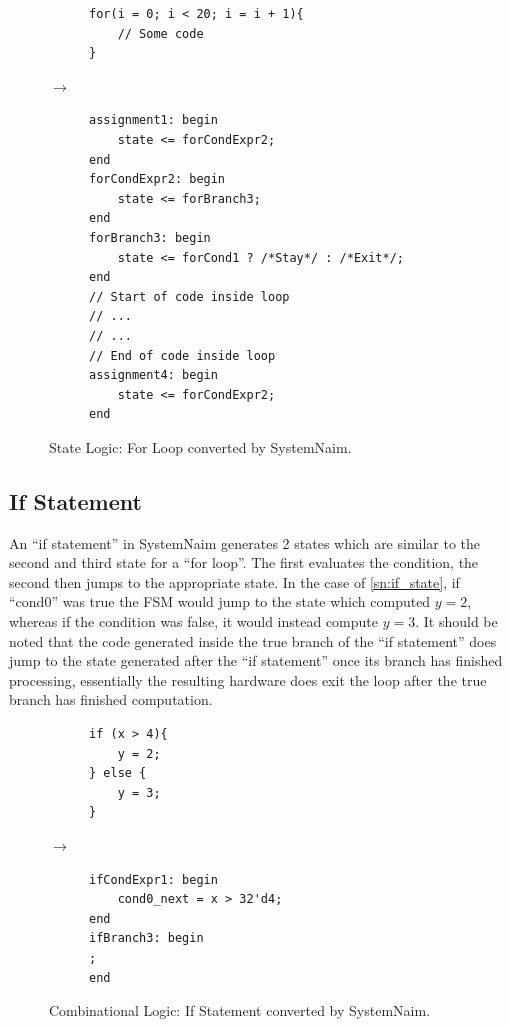 \begin{figure}[H]
\centering
\begin{subfigure}{0.42\textwidth}
    \centering
    \begin{verbatim}
for(i = 0; i < 20; i = i + 1){
    // Some code
}
    \end{verbatim}
\end{subfigure}%
{\LARGE$\rightarrow$}%
\begin{subfigure}{0.48\textwidth}
    \begin{verbatim}
assignment1: begin
    state <= forCondExpr2;
end
forCondExpr2: begin
    state <= forBranch3;
end
forBranch3: begin
    state <= forCond1 ? /*Stay*/ : /*Exit*/;
end
// Start of code inside loop
// ...
// ...
// End of code inside loop
assignment4: begin
    state <= forCondExpr2;
end
\end{verbatim}
\end{subfigure}
\caption{State Logic: For Loop converted by SystemNaim.}
\label{sn:for_state}
\end{figure}

\subsection{If Statement}

An “if statement” in SystemNaim generates 2 states which are similar to the second and third state for a “for loop”. The first evaluates the condition, the second then jumps to the appropriate state. In the case of \autoref{sn:if_state}, if “cond0” was true the FSM would jump to the state which computed $y = 2$, whereas if the condition was false, it would instead compute $y = 3$. It should be noted that the code generated inside the true branch of the “if statement” does jump to the state generated after the “if statement” once its branch has finished processing, essentially the resulting hardware does exit the loop after the true branch has finished computation.

\begin{figure}[H]
\centering
\begin{subfigure}{0.22\textwidth}
    \centering
    \begin{verbatim}
if (x > 4){
    y = 2;
} else {
    y = 3;
}
\end{verbatim}
\end{subfigure}%
{\LARGE$\rightarrow$}%
\begin{subfigure}{0.45\textwidth}
    \begin{verbatim}
ifCondExpr1: begin
    cond0_next = x > 32'd4;
end
ifBranch3: begin
;
end
    \end{verbatim}
\end{subfigure}
\caption{Combinational Logic: If Statement converted by SystemNaim.}
\label{sn:if}
\end{figure}

